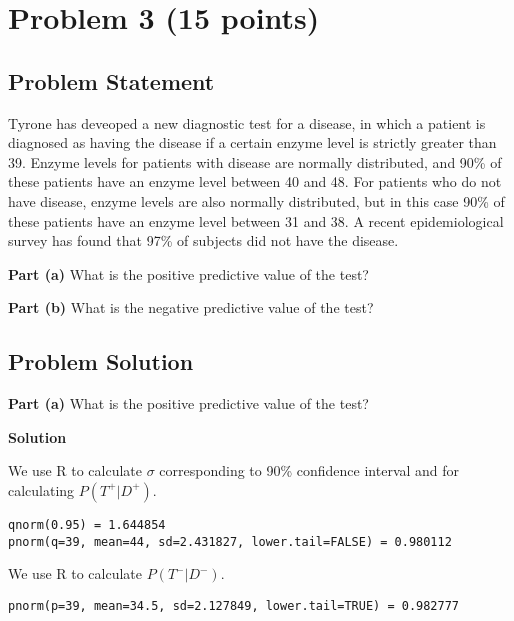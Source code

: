 \documentclass[12pt]{article}
\theoremstyle{definition}
\begin{document}
\newpage
\section*{Problem 3 (15 points)}

\subsection*{Problem Statement}

Tyrone has deveoped a new diagnostic test for a disease, in which a patient is diagnosed as having the disease if a certain enzyme level is strictly greater than 39. Enzyme levels for patients with disease are normally distributed, and 90\% of these patients have an enzyme level between 40 and 48. For patients who do not have disease, enzyme levels are also normally distributed, but in this case 90\% of these patients have an enzyme level between 31 and 38. A recent epidemiological survey has found that 97\% of subjects did not have the disease.

\bigskip
\noindent
{\bf Part (a)} What is the positive predictive value of the test?

\bigskip
\noindent
{\bf Part (b)} What is the negative predictive value of the test?



\subsection*{Problem Solution}

\noindent
{\bf Part (a)} What is the positive predictive value of the test?

\bigskip
\noindent
{\bf Solution}

We use R to calculate $\sigma$ corresponding to 90\% confidence interval and for calculating $P(T^+|D^+)$.
\begin{verbatim}
qnorm(0.95) = 1.644854
pnorm(q=39, mean=44, sd=2.431827, lower.tail=FALSE) = 0.980112
\end{verbatim}
We use R to calculate $P(T^-|D^-)$.
\begin{verbatim}
pnorm(p=39, mean=34.5, sd=2.127849, lower.tail=TRUE) = 0.982777
\end{verbatim}

\newpage
\end{document}
